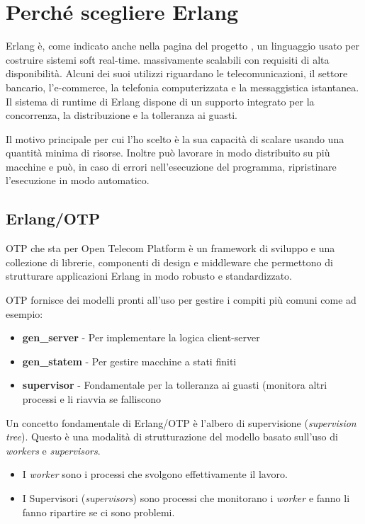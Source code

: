 \section{Perch\'e scegliere Erlang}
Erlang \`e, come indicato anche nella pagina del progetto \cite{web:erlang}, un linguaggio usato per costruire sistemi soft real-time. massivamente scalabili con requisiti di alta disponibilit\`a. Alcuni dei suoi utilizzi riguardano le telecomunicazioni, il settore bancario, l'e-commerce, la telefonia computerizzata e la messaggistica istantanea. Il sistema di runtime di Erlang dispone di un supporto integrato per la concorrenza, la distribuzione e la tolleranza ai guasti.

Il motivo principale per cui l'ho scelto \`e la sua capacit\`a di scalare usando una quantit\`a minima di risorse. Inoltre pu\`o lavorare in modo distribuito su pi\`u macchine e pu\`o, in caso di errori nell'esecuzione del programma, ripristinare l'esecuzione in modo automatico.

\subsection{Erlang/OTP}
OTP che sta per Open Telecom Platform \`e un framework di sviluppo e una collezione di librerie, componenti di design e middleware che permettono di strutturare applicazioni Erlang in modo robusto e standardizzato.

OTP fornisce dei modelli pronti all'uso per gestire i compiti pi\`u comuni come ad esempio:
\begin{itemize}
	\item \textbf{gen\_server} - Per implementare la logica client-server
	\item \textbf{gen\_statem} - Per gestire macchine a stati finiti
	\item \textbf{supervisor} - Fondamentale per la tolleranza ai guasti (monitora altri processi e li riavvia se falliscono
\end{itemize}

Un concetto fondamentale di Erlang/OTP \`e l'albero di supervisione (\textit{supervision tree}). Questo \`e una modalit\`a di strutturazione del modello basato sull'uso di \textit{workers} e \textit{supervisors}.

\begin{itemize}
	\item I \textit{worker} sono i processi che svolgono effettivamente il lavoro.
	\item I Supervisori (\textit{supervisors}) sono processi che monitorano i \textit{worker} e fanno li fanno ripartire se ci sono problemi. 
\end{itemize}

